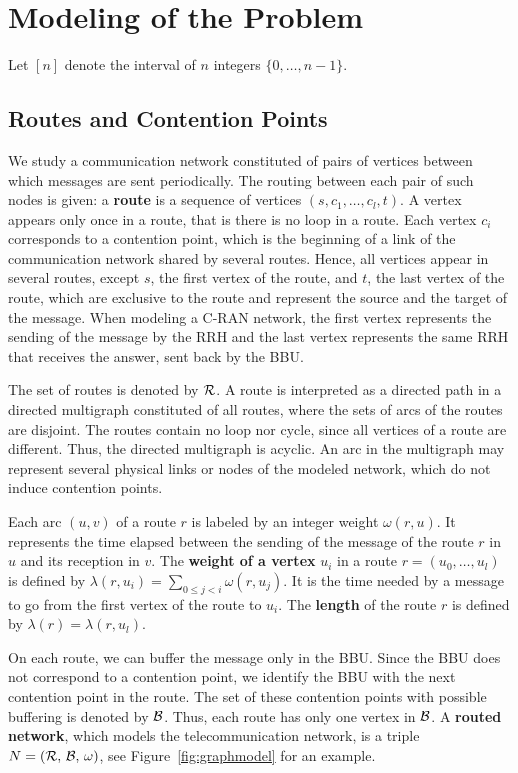 \documentclass[a4paper,10pt]{journal}
\begin{document}
\section{Modeling of the Problem}\label{sec:def}

Let $[n]$ denote the interval of $n$ integers $\{0,\dots,n-1\}$.


	\subsection{Routes and Contention Points}

  	We study a communication network constituted of pairs of vertices between which messages are sent periodically. The routing between each pair of such nodes is given: a \textbf{route} is a sequence of vertices $(s, c_1, \ldots, c_l, t)$. A vertex appears only once in a route, that is there is no loop in a route. Each vertex $c_i$ corresponds to a contention point, which is the beginning of a link of the communication network shared by several routes. Hence, all vertices appear in several routes, except $s$, the first vertex of the route, and $t$, the last vertex of the route, which are exclusive to the route and represent the source and the target of the message. When modeling a C-RAN network,  the first vertex represents the sending of the message
by the RRH and the last vertex represents the same RRH that receives the answer, sent back by the BBU.

  	The set of routes is denoted by ${\cal R}$. A route is interpreted as a directed path in a directed multigraph constituted of all routes, where the sets of arcs of the routes are disjoint. The routes contain no loop nor cycle, since all vertices of a route are different. Thus, the directed multigraph is acyclic. An arc in the multigraph may represent several physical links or nodes of the modeled network, which do not induce contention points. 


  	Each arc $(u,v)$ of a route $r$ is labeled by an integer weight $\omega(r,u)$. It represents the time elapsed between the sending of the message of the route $r$ in $u$ and its reception in $v$.
    The {\bf weight of a vertex} $u_i$ in a route $r=(u_0,\dots,u_l)$ is defined by $\lambda(r,u_i)= \sum\limits_{0 \leq j <i} \omega(r,u_j)$. It is the time needed by a message to go from the first vertex of the route to $u_i$. The \textbf{length} of the route $r$ is defined by $\lambda(r)= \lambda(r,u_l)$. 

  	On each route, we can buffer the message only in the BBU. Since the BBU does not correspond to a contention point, we identify the BBU with the next contention point in the route. The set of these contention points with possible buffering is denoted by ${\cal B}$. Thus, each route has only one vertex in $\cal{B}$.
  	A \textbf{routed network}, which models the telecommunication network, is a triple $N = (\cal{R},\,\cal{B},\,\omega)$, see Figure~\ref{fig:graphmodel} for an example. 
\end{document}
